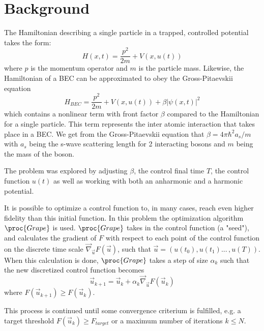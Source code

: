 \documentclass[aps,pra,reprint,superscriptaddress]{revtex4-1}
\begin{document}
\section{\label{sec:back}Background}
The Hamiltonian describing a single particle in a trapped, controlled potential takes the form:
\begin{equation}
	H(x,t) = \frac{p^2}{2m} + V(x,u(t))
\end{equation}
where $p$ is the momentum operator and $m$ is the particle mass. Likewise, the Hamiltonian of a BEC can be approximated to obey the Gross-Pitaevskii equation
\begin{equation}
	H_{BEC} = \frac{p^2}{2m} + V(x,u(t)) + \beta |\psi(x,t)|^2
	\label{eq:Hbec}
\end{equation}
which contains a nonlinear term with front factor $\beta$ compared to the Hamiltonian for a single particle. This term represents the inter atomic interaction that takes place in a BEC. We get from the Gross-Pitaevskii equation that $\beta = 4\pi\hbar^2 a_s / m$ with $a_s$ being the s-wave scattering length for 2 interacting bosons and $m$ being the mass of the boson.

The problem was explored by adjusting $\beta$, the control final time $T$, the control function $u(t)$ as well as working with both an anharmonic and a harmonic potential.

It is possible to optimize a control function to, in many cases, reach even higher fidelity than this initial function. In this problem the optimization algorithm $\proc{Grape}$ is used. $\proc{Grape}$ takes in the control function (a "seed"), and calculates the gradient of $F$ with respect to each point of the control function on the discrete time scale $\vec{\nabla}_{\vec{u}}F(\vec{u})$, such that $\vec{u} = (u(t_0), u(t_1) ... \,, u(T))$. When this calculation is done, $\proc{Grape}$ takes a step of size $\alpha_k$ such that the new discretized control function becomes
\begin{equation}
	\vec{u}_{k+1} = \vec{u}_{k} + \alpha_k \vec{\nabla}_{\vec{u}}F(\vec{u}_k)
\end{equation}
where $F(\vec{u}_{k+1}) \geq F(\vec{u}_{k})$.

This process is continued until some convergence criterium is fulfilled, e.g. a target threshold $F(\vec{u}_{k}) \geq F_{target}$ or a maximum number of iterations $k \leq N$.
\end{document}
